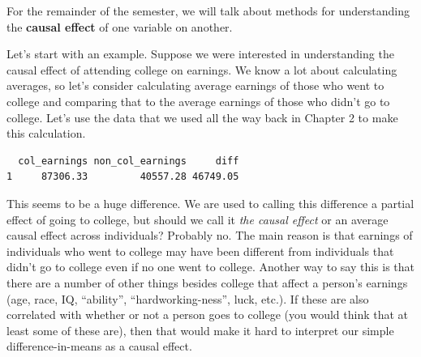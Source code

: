 \documentclass[
  letterpaper,
  DIV=11,
  numbers=noendperiod]{scrreprt}
\newenvironment{Shaded}{\begin{snugshade}}{\end{snugshade}}
\newcommand{\AttributeTok}[1]{\textcolor[rgb]{0.40,0.45,0.13}{#1}}
\newcommand{\DecValTok}[1]{\textcolor[rgb]{0.68,0.00,0.00}{#1}}
\newcommand{\FunctionTok}[1]{\textcolor[rgb]{0.28,0.35,0.67}{#1}}
\newcommand{\NormalTok}[1]{\textcolor[rgb]{0.00,0.23,0.31}{#1}}
\newcommand{\OtherTok}[1]{\textcolor[rgb]{0.00,0.23,0.31}{#1}}
\newcommand{\SpecialCharTok}[1]{\textcolor[rgb]{0.37,0.37,0.37}{#1}}
\newcommand{\StringTok}[1]{\textcolor[rgb]{0.13,0.47,0.30}{#1}}
\begin{document}
For the remainder of the semester, we will talk about methods for
understanding the \textbf{causal effect} of one variable on another.

Let's start with an example. Suppose we were interested in understanding
the causal effect of attending college on earnings. We know a lot about
calculating averages, so let's consider calculating average earnings of
those who went to college and comparing that to the average earnings of
those who didn't go to college. Let's use the data that we used all the
way back in Chapter 2 to make this calculation.

\begin{Shaded}
\end{Shaded}

\begin{verbatim}
  col_earnings non_col_earnings     diff
1     87306.33         40557.28 46749.05
\end{verbatim}

This seems to be a huge difference. We are used to calling this
difference a partial effect of going to college, but should we call it
\emph{the causal effect} or an average causal effect across individuals?
Probably no. The main reason is that earnings of individuals who went to
college may have been different from individuals that didn't go to
college even if no one went to college. Another way to say this is that
there are a number of other things besides college that affect a
person's earnings (age, race, IQ, ``ability'', ``hardworking-ness'',
luck, etc.). If these are also correlated with whether or not a person
goes to college (you would think that at least some of these are), then
that would make it hard to interpret our simple difference-in-means as a
causal effect.
\end{document}
